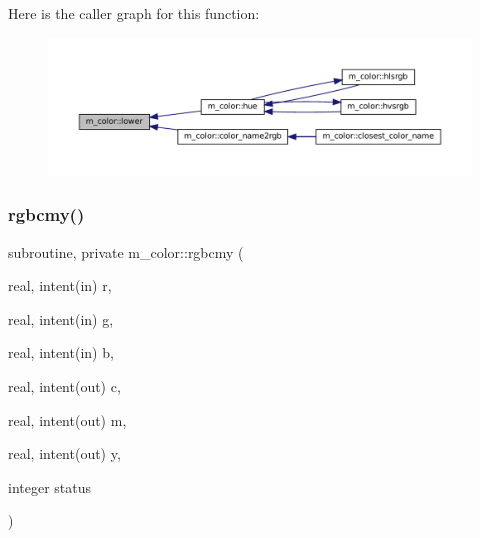 Here is the caller graph for this function\+:
\nopagebreak
\begin{figure}[H]
\begin{center}
\leavevmode
\includegraphics[width=350pt]{namespacem__color_a704e93b42d777a827ec557c92d2dd7dc_icgraph}
\end{center}
\end{figure}
\mbox{\label{namespacem__color_ad6e8505eef5add299c4475d289f3c5c5}} 
\subsubsection{\texorpdfstring{rgbcmy()}{rgbcmy()}}
{\footnotesize\ttfamily subroutine, private m\+\_\+color\+::rgbcmy (\begin{DoxyParamCaption}\item[{real, intent(in)}]{r,  }\item[{real, intent(in)}]{g,  }\item[{real, intent(in)}]{b,  }\item[{real, intent(out)}]{c,  }\item[{real, intent(out)}]{m,  }\item[{real, intent(out)}]{y,  }\item[{integer}]{status }\end{DoxyParamCaption})\hspace{0.3cm}{\ttfamily [private]}}


